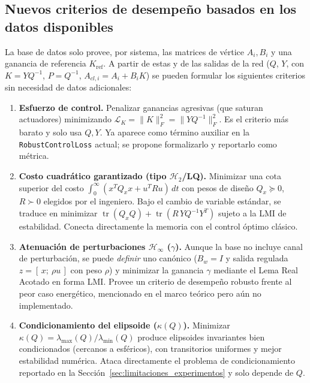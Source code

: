 \subsection{Nuevos criterios de desempeño basados en los datos disponibles}
{\color{revcolor}
La base de datos solo provee, por sistema, las matrices de vértice $A_i, B_i$ y una ganancia de referencia $K_\text{ref}$. A partir de estas y de las salidas de la red ($Q$, $Y$, con $K = YQ^{-1}$, $P = Q^{-1}$, $A_{cl,i} = A_i + B_i K$) se pueden formular los siguientes criterios sin necesidad de datos adicionales:

\begin{enumerate}
    \item \textbf{Esfuerzo de control.} Penalizar ganancias agresivas (que saturan actuadores) minimizando $\mathcal{L}_K = \lVert K \rVert_F^2 = \lVert Y Q^{-1} \rVert_F^2$. Es el criterio más barato y solo usa $Q, Y$. Ya aparece como término auxiliar en la \texttt{RobustControlLoss} actual; se propone formalizarlo y reportarlo como métrica.

    \item \textbf{Costo cuadrático garantizado (tipo $\mathcal{H}_2$/LQ).} Minimizar una cota superior del costo $\int_0^\infty (x^T Q_x x + u^T R u)\,dt$ con pesos de diseño $Q_x \succeq 0$, $R \succ 0$ elegidos por el ingeniero. Bajo el cambio de variable estándar, se traduce en minimizar $\operatorname{tr}(Q_x Q) + \operatorname{tr}(R\, Y Q^{-1} Y^T)$ sujeto a la LMI de estabilidad. Conecta directamente la memoria con el control óptimo clásico.

    \item \textbf{Atenuación de perturbaciones $\mathcal{H}_\infty$ ($\gamma$).} Aunque la base no incluye canal de perturbación, se puede \emph{definir} uno canónico ($B_w = I$ y salida regulada $z = [\,x;\ \rho u\,]$ con peso $\rho$) y minimizar la ganancia $\gamma$ mediante el Lema Real Acotado en forma LMI. Provee un criterio de desempeño robusto frente al peor caso energético, mencionado en el marco teórico pero aún no implementado.

    \item \textbf{Condicionamiento del elipsoide ($\kappa(Q)$).} Minimizar $\kappa(Q) = \lambda_{\max}(Q)/\lambda_{\min}(Q)$ produce elipsoides invariantes bien condicionados (cercanos a esféricos), con transitorios uniformes y mejor estabilidad numérica. Ataca directamente el problema de condicionamiento reportado en la Sección~\ref{sec:limitaciones_experimentos} y solo depende de $Q$.


\end{enumerate}}
